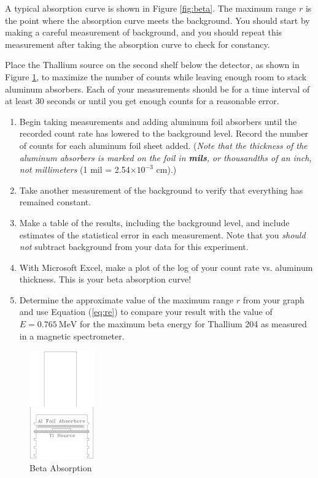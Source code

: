 A typical absorption curve is shown in Figure {\ref{fig:beta}}. The maximum range $r$ is the point where the absorption curve meets the background. You should start by making a careful measurement of background, and you should repeat this measurement after taking the absorption curve to check for constancy.\myskip

Place the Thallium source on the second shelf below the detector, as shown in Figure {\ref{fig:absorption}}, to maximize the number of counts while leaving enough room to stack aluminum absorbers. Each of your measurements should be for a time interval of at least 30 seconds or until you get enough counts for a reasonable error.
\begin{enumerate}
  \item Begin taking measurements and adding aluminum foil absorbers until the recorded count rate has lowered to the background level. Record the number of counts for each aluminum foil sheet added. (\emph{Note that the thickness of the aluminum absorbers is marked on the foil in \textbf{mils}, or thousandths of an inch, not millimeters} (1 mil = 2.54$\times 10^{-3}$ cm).)
  \item Take another measurement of the background to verify that everything has remained constant.
  \item Make a table of the results, including the background level, and include estimates of the statistical error in each measurement. Note that you \emph{should not} subtract background from your data for this experiment.
  \item With Microsoft Excel, make a plot of the log of your count rate vs. aluminum thickness. This is your beta absorption curve!
  \item Determine the approximate value of the maximum range $r$ from your graph and use Equation ({\ref{eq:re}}) to compare your result with the value of $E = 0.765\ \mathrm{MeV}$ for the maximum beta energy for Thallium 204 as measured in a magnetic spectrometer.
\end{enumerate}

\begin{figure}[h]
\centering
\includegraphics[width=0.25\textwidth]{./Exp10/pic/image8.png}
\caption{Beta Absorption}
\label{fig:absorption}
\end{figure}


